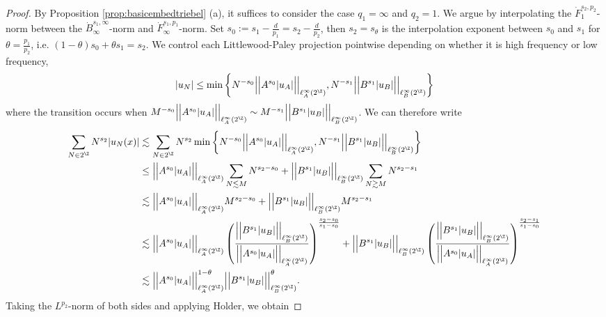 \begin{proof}
	By Proposition \ref{prop:basicembedtriebel} (a), it suffices to consider the case $q_1 = \infty$ and $q_2 = 1$. We argue by interpolating the $\dot F^{s_2, p_2}_1$-norm between the $\dot B^{s_1, \infty}_\infty$-norm and $\dot F^{s_1, p_1}_\infty$-norm. Set $s_0 := s_1 - \tfrac{d}{p_1} = s_2 - \tfrac{d}{p_2}$, then $s_2 = s_\theta$ is the interpolation exponent between $s_0$ and $s_1$ for $\theta = \tfrac{p_1}{p_2}$, i.e. $(1 - \theta) s_0 + \theta s_1 = s_2$. We control each Littlewood-Paley projection pointwise depending on whether it is high frequency or low frequency, 	
		\[ |u_N| \leq \min \left\{ N^{-s_0} \Big|\Big| A^{s_0} |u_A| \Big| \Big|_{\ell^\infty_A (2^\Z)} , N^{-s_1} \Big|\Big| B^{s_1} |u_B| \Big| \Big|_{\ell^\infty_B (2^\Z)}\right\}\]
	where the transition occurs when $M^{-s_0} \Big|\Big| A^{s_0} |u_A| \Big| \Big|_{\ell^\infty_A (2^\Z)} \sim M^{-s_1} \Big|\Big| B^{s_1} |u_B| \Big| \Big|_{\ell^\infty_B (2^\Z)}$. We can therefore write
		\begin{align*}
			\sum_{N \in 2^\Z} N^{s_2} |u_N(x)| 
				&\lesssim \sum_{N \in 2^\Z} N^{s_2} \min \left\{ N^{-s_0} \Big|\Big| A^{s_0} |u_A| \Big| \Big|_{\ell^\infty_A (2^\Z)} , N^{-s_1} \Big|\Big| B^{s_1} |u_B| \Big| \Big|_{\ell^\infty_B (2^\Z)}\right\} \\
				&\leq  \Big|\Big| A^{s_0} |u_A| \Big| \Big|_{\ell^\infty_A (2^\Z)}\sum_{N \lesssim M} N^{s_2 -s_0} 		
				 + \Big|\Big| B^{s_1} |u_B| \Big| \Big|_{\ell^\infty_B (2^\Z)}\sum_{N \gtrsim M} N^{s_2 -s_1} 
				\\
				&\lesssim \Big|\Big| A^{s_0} |u_A| \Big| \Big|_{\ell^\infty_A (2^\Z)} M^{s_2 -s_0} 		
				 + \Big|\Big| B^{s_1} |u_B| \Big| \Big|_{\ell^\infty_B (2^\Z)} M^{s_2 -s_1} 
				\\
				&\lesssim  \Big|\Big| A^{s_0} |u_A| \Big| \Big|_{\ell^\infty_A (2^\Z)} \left( \frac{\Big|\Big| B^{s_1} |u_B| \Big| \Big|_{\ell^\infty_B (2^\Z)}}{\Big|\Big| A^{s_0} |u_A| \Big| \Big|_{\ell^\infty_A (2^\Z)}} \right)^{\frac{s_2 - s_0}{s_1 - s_0}} + \Big|\Big| B^{s_1} |u_B| \Big| \Big|_{\ell^\infty_B (2^\Z)} \left( \frac{\Big|\Big| B^{s_1} |u_B| \Big| \Big|_{\ell^\infty_B (2^\Z)}}{\Big|\Big| A^{s_0} |u_A| \Big| \Big|_{\ell^\infty_A (2^\Z)}} \right)^{\frac{s_2 - s_1}{s_1 - s_0}} \\
				&\lesssim \Big|\Big| A^{s_0} |u_A| \Big| \Big|_{\ell^\infty_A (2^\Z)}^{1 - \theta} \Big|\Big| B^{s_1} |u_B| \Big| \Big|_{\ell^\infty_B (2^\Z)}^\theta.
		\end{align*}	
	Taking the $L^{p_2}$-norm of both sides and applying Holder, we obtain 

\end{proof}
